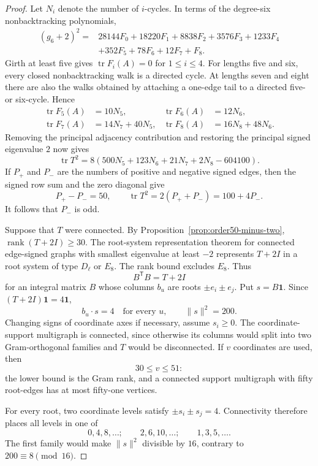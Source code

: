 \documentclass[a4paper,10pt,reqno]{amsart}
\theoremstyle{plain}
\theoremstyle{definition}
\theoremstyle{remark}
\newcommand{\one}{\mathbf 1}
\newcommand{\tr}{\operatorname{tr}}
\begin{document}
\begin{proof}
Let \(N_i\) denote the number of \(i\)-cycles.  In terms of the degree-six
nonbacktracking polynomials,
\[
\begin{aligned}
(g_6+2)^2={}&28144F_0+18220F_1+8838F_2+3576F_3+1233F_4\\
&+352F_5+78F_6+12F_7+F_8.
\end{aligned}
\]
Girth at least five gives \(\tr F_i(A)=0\) for \(1\le i\le4\).  For
lengths five and six, every closed nonbacktracking walk is a directed cycle.
At lengths seven and eight there are also the walks obtained by attaching a
one-edge tail to a directed five- or six-cycle.  Hence
\[
\begin{aligned}
\tr F_5(A)&=10N_5,&
\tr F_6(A)&=12N_6,\\
\tr F_7(A)&=14N_7+40N_5,&
\tr F_8(A)&=16N_8+48N_6.
\end{aligned}
\]
Removing the principal adjacency contribution and restoring the principal
signed eigenvalue \(2\) now gives
\[
\tr T^2
=8(500N_5+123N_6+21N_7+2N_8-604100).
\]
If \(P_+\) and \(P_-\) are the numbers of positive and negative signed edges,
then the signed row sum and the zero diagonal give
\[
P_+-P_-=50,\qquad
\tr T^2=2(P_++P_-)=100+4P_-.
\]
It follows that \(P_-\) is odd.

Suppose that \(T\) were connected.  By
Proposition~\ref{prop:order50-minus-two},
\(\operatorname{rank}(T+2I)\ge30\).  The root-system representation theorem for connected
edge-signed graphs with smallest eigenvalue at least \(-2\)
\cite[Theorem~2]{GreavesEtAl2015} represents \(T+2I\) in a root system of
type \(D_\ell\) or \(E_8\).  The rank bound excludes \(E_8\).  Thus
\[
B^{\mathsf T}B=T+2I
\]
for an integral matrix \(B\) whose columns \(b_u\) are roots
\(\pm e_i\pm e_j\).  Put \(s=B\one\).  Since
\((T+2I)\one=4\one\),
\[
b_u\mathbin{\cdot}s=4\quad\text{for every }u,
\qquad
\lVert s\rVert^2=200.
\]
Changing signs of coordinate axes if necessary, assume \(s_i\ge0\).
The coordinate-support multigraph is connected, since otherwise its columns
would split into two Gram-orthogonal families and \(T\) would be disconnected.
If \(v\) coordinates are used, then
\[
30\le v\le51:
\]
the lower bound is the Gram rank, and a connected support multigraph with
fifty root-edges has at most fifty-one vertices.

For every root, two coordinate levels satisfy
\(\pm s_i\pm s_j=4\).  Connectivity therefore places all levels in one of
\[
0,4,8,\ldots;\qquad
2,6,10,\ldots;\qquad
1,3,5,\ldots.
\]
The first family would make \(\lVert s\rVert^2\) divisible by \(16\), contrary
to \(200\equiv8\pmod {16}\).


\end{proof}
\end{document}
